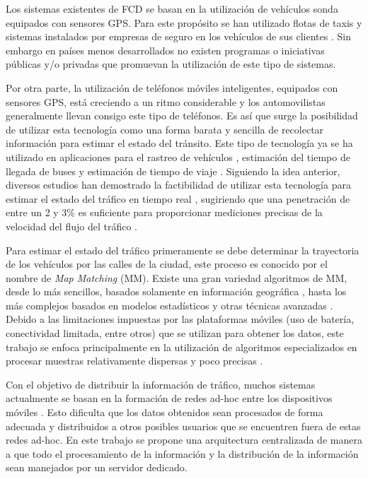 Los sistemas existentes de FCD se basan en la utilización de vehículos sonda equipados con sensores GPS. Para este propósito se han utilizado flotas de taxis \cite{schafer2002traffic,reinthaler2007evaluation} y sistemas instalados por empresas de seguro en los vehículos de sus clientes \cite{giovannini2011novel}. Sin embargo en países menos desarrollados no existen programas o iniciativas públicas y/o privadas que promuevan la utilización de este tipo de sistemas.

Por otra parte, la utilización de teléfonos móviles inteligentes, equipados con sensores GPS, está creciendo a un ritmo considerable y los automovilistas generalmente llevan consigo este tipo de teléfonos. Es así que surge la posibilidad de utilizar esta tecnología como una forma barata y sencilla de recolectar información para estimar el estado del tránsito. Este tipo de tecnología ya se ha utilizado en aplicaciones para el rastreo de vehículos \cite{thiagarajan2010cooperative}, estimación del tiempo de llegada de buses \cite{zhou2012long} y estimación de tiempo de viaje \cite{thiagarajan2009vtrack}. Siguiendo la idea anterior, diversos estudios han demostrado la factibilidad de utilizar esta tecnología para estimar el estado del tráfico en tiempo real \cite{tao2012real,herrera2010evaluation}, sugiriendo que una penetración de entre un 2 y 3\% es suficiente para proporcionar mediciones precisas de la velocidad del flujo del tráfico \cite{herrera2010evaluation}.

Para estimar el estado del tráfico primeramente se debe determinar la trayectoria de los vehículos por las calles de la ciudad, este proceso es conocido por el nombre de \emph{Map Matching} (MM). Existe una gran variedad algoritmos de MM, desde lo más sencillos, basados solamente en información geográfica \cite{white2000some}, hasta los más complejos basados en modelos estadísticos y otras técnicas avanzadas \cite{quddus2006high,kim2001adaptive}. Debido a las limitaciones impuestas por las plataformas móviles (uso de batería, conectividad limitada, entre otros) que se utilizan para obtener los datos, este trabajo se enfoca principalmente en la utilización de algoritmos especializados en procesar muestras relativamente dispersas y poco precisas \cite{lou2009map}.

Con el objetivo de distribuir la información de tráfico, muchos sistemas actualmente se basan en la formación de redes ad-hoc entre los dispositivos móviles \cite{zhong2008disseminating,leontiadis2011effectiveness}. Esto dificulta que los datos obtenidos sean procesados de forma adecuada y distribuidos a otros posibles usuarios que se encuentren fuera de estas redes ad-hoc. En este trabajo se propone una arquitectura centralizada de manera a que todo el procesamiento de la información y la distribución de la información sean manejados por un servidor dedicado.

